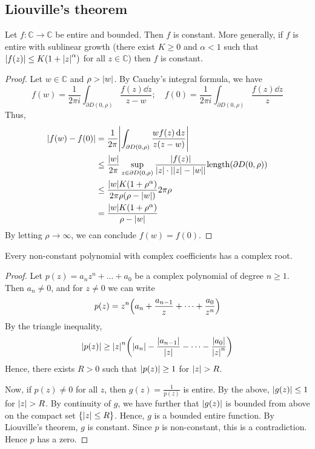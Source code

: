 \subsection{Liouville's theorem}
\begin{theorem}
	Let \( f \colon \mathbb C \to \mathbb C \) be entire and bounded.
	Then \( f \) is constant.
	More generally, if \( f \) is entire with sublinear growth (there exist \( K \geq 0 \) and \( \alpha < 1 \) such that \( \abs{f(z)} \leq K(1+\abs{z}^\alpha) \) for all \( z \in \mathbb C \)) then \( f \) is constant.
\end{theorem}
\begin{proof}
	Let \( w \in \mathbb C \) and \( \rho > \abs{w} \).
	By Cauchy's integral formula, we have
	\[
		f(w) = \frac{1}{2 \pi i} \int_{\partial D(0,\rho)} \frac{f(z)\dd{z}}{z-w};\quad f(0) = \frac{1}{2 \pi i} \int_{\partial D(0,\rho)} \frac{f(z) \dd{z}}{z}
	\]
	Thus,
	\begin{align*}
		\abs{f(w) - f(0)} & = \frac{1}{2\pi} \abs{\int_{\partial D(0,\rho)} \frac{wf(z) \dd{z}}{z(z-w)}}                                                                            \\
		                  & \leq \frac{\abs{w}}{2 \pi} \sup_{z \in \partial D(0,\rho)} \frac{\abs{f(z)}}{\abs{z} \cdot \abs{\abs{z} - \abs{w}}} \mathrm{length}(\partial D(0,\rho)) \\
		                  & \leq \frac{\abs{w} K(1+\rho^\alpha)}{2\pi \rho(\rho - \abs{w})} 2 \pi \rho                                                                              \\
		                  & = \frac{\abs{w}K(1+\rho^\alpha)}{\rho - \abs{w}}
	\end{align*}
	By letting \( \rho \to \infty \), we can conclude \( f(w) = f(0 )\).
\end{proof}
\begin{theorem}
	Every non-constant polynomial with complex coefficients has a complex root.
\end{theorem}
\begin{proof}
	Let \( p(z) = a_n z^n + \dots + a_0 \) be a complex polynomial of degree \( n \geq 1 \).
	Then \( a_n \neq 0 \), and for \( z \neq 0 \) we can write
	\[
		p(z) = z^n \qty(a_n + \frac{a_{n-1}}{z} + \dots + \frac{a_0}{z^n} )
	\]
	By the triangle inequality,
	\[
		\abs{p(z)} \geq \abs{z}^n \qty(\abs{a_n} - \frac{\abs{a_{n-1}}}{\abs{z}} - \dots - \frac{\abs{a_0}}{\abs{z}^n})
	\]
	Hence, there exists \( R > 0 \) such that \( \abs{p(z)} \geq 1 \) for \( \abs{z} > R \).

	Now, if \( p(z) \neq 0 \) for all \( z \), then \( g(z) = \frac{1}{p(z)} \) is entire.
	By the above, \( \abs{g(z)} \leq 1 \) for \( \abs{z} > R \).
	By continuity of \( g \), we have further that \( \abs{g(z)} \) is bounded from above on the compact set \( \qty{\abs{z} \leq R} \).
	Hence, \( g \) is a bounded entire function.
	By Liouville's theorem, \( g \) is constant.
	Since \( p \) is non-constant, this is a contradiction.
	Hence \( p \) has a zero.
\end{proof}

